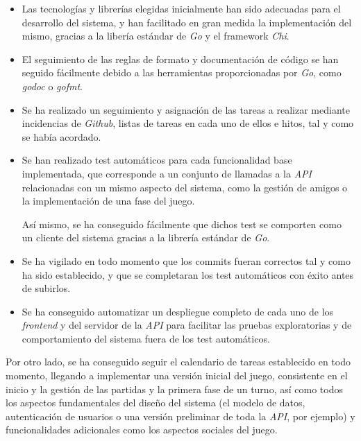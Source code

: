 \documentclass[11pt, a4paper, titlepage]{article}
\begin{document}
\begin{itemize}
    \item Las tecnologías y librerías elegidas inicialmente han sido adecuadas para el desarrollo del sistema, y han facilitado en gran medida la implementación del mismo, gracias a la libería estándar de \textit{Go} y el framework \textit{Chi}.

    \item El seguimiento de las reglas de formato y documentación de código se han seguido fácilmente debido a las herramientas proporcionadas por \textit{Go}, como \textit{godoc} o \textit{gofmt}.

    \item Se ha realizado un seguimiento y asignación de las tareas a realizar mediante incidencias de \textit{Github},  listas de tareas en cada uno de ellos e hitos, tal y como se había acordado.

    \item Se han realizado test automáticos para cada funcionalidad base implementada, que corresponde a un conjunto de llamadas a la \textit{API} relacionadas con un mismo aspecto del sistema, como la gestión de amigos o la implementación de una fase del juego.

    Así mismo, se ha conseguido fácilmente que dichos test se comporten como un cliente del sistema gracias a la librería estándar de \textit{Go}.

    \item Se ha vigilado en todo momento que los commits fueran correctos tal y como ha sido establecido, y que se completaran los test automáticos con éxito antes de subirlos.

    \item Se ha conseguido automatizar un despliegue completo de cada uno de los \textit{frontend} y del servidor de la \textit{API} para facilitar las pruebas exploratorias y de comportamiento del sistema fuera de los test automáticos.
\end{itemize}


Por otro lado, se ha conseguido seguir el calendario de tareas establecido en todo momento, llegando a implementar una versión inicial del juego, consistente en el inicio y la gestión de las partidas y la primera fase de un turno, así como todos los aspectos fundamentales del diseño del sistema (el modelo de datos, autenticación de usuarios o una versión preliminar de toda la \textit{API}, por ejemplo) y funcionalidades adicionales como los aspectos sociales del juego.
\end{document}
